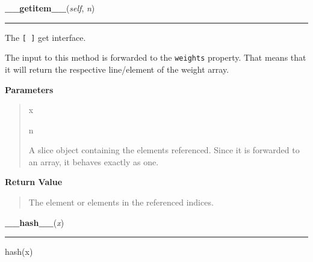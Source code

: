     \begin{boxedminipage}{\textwidth}

    \raggedright \textbf{\_\_getitem\_\_}(\textit{self}, \textit{n})

    \vspace{-1.5ex}

    \rule{\textwidth}{0.5\fboxrule}

The \texttt{{[} {]}} get interface.

The input to this method is forwarded to the \texttt{weights} property. That
means that it will return the respective line/element of the weight
array.
    \vspace{1ex}

      \textbf{Parameters}
      \begin{quote}
        \begin{Ventry}{x}

          \item[n]


A slice object containing the elements referenced. Since it is
forwarded to an array, it behaves exactly as one.
        \end{Ventry}

      \end{quote}

    \vspace{1ex}

      \textbf{Return Value}
      \begin{quote}

The element or elements in the referenced indices.
      \end{quote}

    \vspace{1ex}

    \end{boxedminipage}

    \label{object:__hash__}

    \vspace{0.5ex}

    \begin{boxedminipage}{\textwidth}

    \raggedright \textbf{\_\_hash\_\_}(\textit{x})

    \vspace{-1.5ex}

    \rule{\textwidth}{0.5\fboxrule}

hash(x)
    \vspace{1ex}

    \end{boxedminipage}

